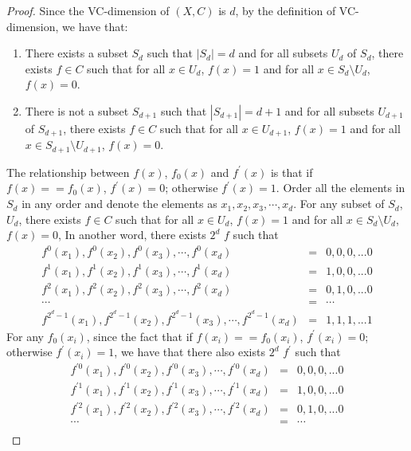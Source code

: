 \begin{proof}
    Since the VC-dimension of $(X, C)$ is $d$, by the definition of VC-dimension, we have that:  
    \begin{enumerate}
        \item There exists a subset $S_d$ such that $|S_d|=d$ and for all subsets $U_d$ of $S_d$, there exists $f\in C$ such that for all $x\in U_d$, $f(x)=1$ and for all $x\in S_d\setminus U_d$, $f(x)=0$.
        \item There is not a subset $S_{d+1}$ such that $|S_{d+1}|=d+1$ and for all subsets $U_{d+1}$ of $S_{d+1}$, there exists $f\in C$ such that for all $x\in U_{d+1}$, $f(x)=1$ and for all $x\in S_{d+1}\setminus U_{d+1}$, $f(x)=0$.
    \end{enumerate}
    The relationship between $f(x)$, $f_0(x)$ and $f^{\prime}(x)$ is that if $f(x)==f_0(x)$, $f^{\prime}(x)=0$; otherwise $f^{\prime}(x)=1$.
    Order all the elements in $S_d$ in any order and denote the elements as $x_1,x_2,x_3,\cdots,x_d$.
    For any subset of $S_d$, $U_d$, there exists  $f\in C$ such that for all $x\in U_d$, $f(x)=1$ and for all $x\in S_d\setminus U_d$, $f(x)=0$, 
    In another word, there exists $2^d$ $f$ such that 
    \begin{align}
        \nonumber f^0(x_1),f^0(x_2),f^0(x_3),\cdots, f^0(x_d)&=&0,0,0,...0\\
        \nonumber f^1(x_1),f^1(x_2),f^1(x_3),\cdots, f^1(x_d)&=&1,0,0,...0\\
        \nonumber f^2(x_1),f^2(x_2),f^2(x_3),\cdots, f^2(x_d)&=&0,1,0,...0\\
        \nonumber \cdots &=& \cdots\\
        \nonumber f^{2^d-1}(x_1),f^{2^d-1}(x_2),f^{2^d-1}(x_3),\cdots, f^{2^d-1}(x_d)&=&1,1,1,...1
    \end{align}
    For any $f_0(x_i)$, since the fact that if $f(x_i)==f_0(x_i)$, $f^{\prime}(x_i)=0$; otherwise $f^{\prime}(x_i)=1$,
    we have that there also exists $2^d$ $f^{\prime}$ such that 
    \begin{align}
        \nonumber f^{\prime 0}(x_1),f^{\prime 0}(x_2),f^{\prime 0}(x_3),\cdots, f^{\prime 0}(x_d)&=&0,0,0,...0\\
        \nonumber f^{\prime 1}(x_1),f^{\prime 1}(x_2),f^{\prime 1}(x_3),\cdots, f^{\prime 1}(x_d)&=&1,0,0,...0\\
        \nonumber f^{\prime 2}(x_1),f^{\prime 2}(x_2),f^{\prime 2}(x_3),\cdots, f^{\prime 2}(x_d)&=&0,1,0,...0\\
        \nonumber \cdots &=& \cdots\\

\end{align}
\end{proof}
